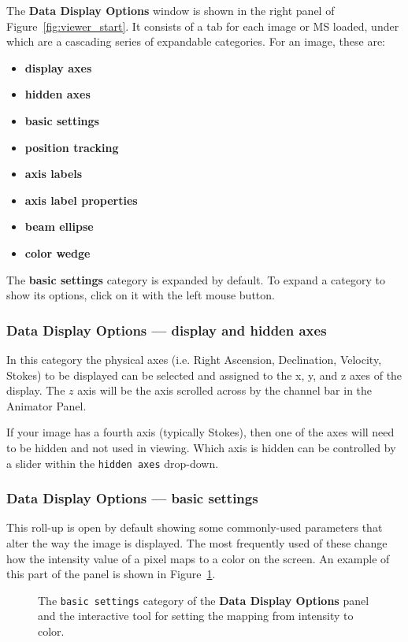The {\bf Data Display Options} window is shown in the right panel
of Figure~\ref{fig:viewer_start}.  It consists of a tab for each
image or MS loaded, under which are a cascading series of expandable
categories.  For an image, these are:
\begin{itemize}
   \item {\bf display axes}
   \item {\bf hidden axes}
   \item {\bf basic settings}
   \item {\bf position tracking}
   \item {\bf axis labels}
   \item {\bf axis label properties}
   \item {\bf beam ellipse}
   \item {\bf color wedge}
\end{itemize}
The {\bf basic settings} category is expanded by
default.  To expand a category to show its options, click on it with
the left mouse button.


\subsubsection{Data Display Options --- display and hidden axes}
In this category the physical axes (i.e. Right Ascension, Declination,
Velocity, Stokes) to be displayed can be selected and assigned to the
x, y, and z axes of the display. The $z$ axis will be the axis scrolled across
by the channel bar in the Animator Panel.

If your image has a fourth axis (typically Stokes), then one of the axes
will need to be hidden and not used in viewing. Which axis is hidden 
can be controlled by a slider within the {\tt hidden axes} drop-down.

\subsubsection{Data Display Options --- basic settings}
\label{section:display.image.raster.adjust.basic}

This roll-up is open by default showing some commonly-used parameters
that alter the way the image is displayed. The most frequently used of these
change how the intensity value of a pixel maps to a color on 
the screen. An example of this part of the panel is shown in
Figure~\ref{fig:viewer_raster_basic}.

\begin{figure}[h!]
\begin{center}
\caption{\label{fig:viewer_raster_basic} The {\tt basic settings}
category of the {\bf Data Display Options} panel and the interactive
tool for setting the mapping from intensity to color.}
\hrulefill
\end{center}
\end{figure}

